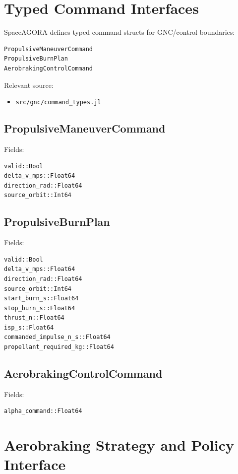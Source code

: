 \documentclass[11pt]{article}
\begin{document}
\section{Typed Command Interfaces}

SpaceAGORA defines typed command structs for GNC/control boundaries:

\begin{lstlisting}
PropulsiveManeuverCommand
PropulsiveBurnPlan
AerobrakingControlCommand
\end{lstlisting}

Relevant source:
\begin{itemize}
  \item \texttt{src/gnc/command\_types.jl}
\end{itemize}

\subsection{PropulsiveManeuverCommand}

Fields:

\begin{lstlisting}
valid::Bool
delta_v_mps::Float64
direction_rad::Float64
source_orbit::Int64
\end{lstlisting}

\subsection{PropulsiveBurnPlan}

Fields:

\begin{lstlisting}
valid::Bool
delta_v_mps::Float64
direction_rad::Float64
source_orbit::Int64
start_burn_s::Float64
stop_burn_s::Float64
thrust_n::Float64
isp_s::Float64
commanded_impulse_n_s::Float64
propellant_required_kg::Float64
\end{lstlisting}

\subsection{AerobrakingControlCommand}

Fields:

\begin{lstlisting}
alpha_command::Float64
\end{lstlisting}

\section{Aerobraking Strategy and Policy Interface}
\end{document}
